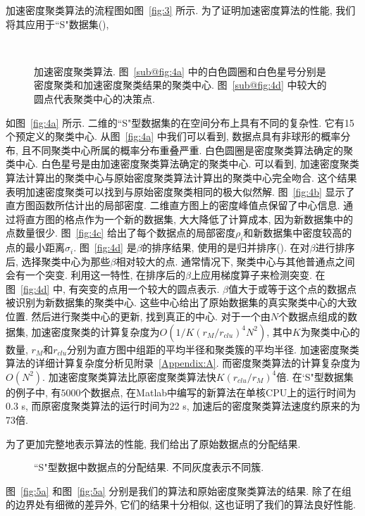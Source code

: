 加速密度聚类算法的流程图如图~\ref{fig:3} 所示. 为了证明加速密度算法的性能, 我们将其应用于``S"数据集(\cite{Fraenti2006}), 
\begin{figure}[htb]
    \centering
    \\
    \caption{加速密度聚类算法. 图~\ref{sub@fig:4a} 中的白色圆圈和白色星号分别是密度聚类和加速密度聚类结果的聚类中心. 图~\ref{sub@fig:4d} 中较大的圆点代表聚类中心的决策点. }
\end{figure}
如图~\ref{fig:4a} 所示. 二维的``S"型数据集的在空间分布上具有不同的复杂性. 它有15个预定义的聚类中心. 从图~\ref{fig:4a} 中我们可以看到, 数据点具有非球形的概率分布, 且不同聚类中心所属的概率分布重叠严重. 白色圆圈是密度聚类算法确定的聚类中心. 白色星号是由加速密度聚类算法确定的聚类中心. 可以看到, 加速密度聚类算法计算出的聚类中心与原始密度聚类算法计算出的聚类中心完全吻合. 这个结果表明加速密度聚类可以找到与原始密度聚类相同的极大似然解. 图~\ref{fig:4b} 显示了直方图函数所估计出的局部密度. 二维直方图上的密度峰值点保留了中心信息. 通过将直方图的格点作为一个新的数据集, 大大降低了计算成本, 因为新数据集中的点数量很少. 图~\ref{fig:4c} 给出了每个数据点的局部密度$\rho_i$和新数据集中密度较高的点的最小距离$\sigma_i$. 图~\ref{fig:4d} 是$\beta$的排序结果, 使用的是归并排序(\cite{Satish2010}). 在对$\beta$进行排序后, 选择聚类中心为那些$\beta$相对较大的点. 通常情况下, 聚类中心与其他普通点之间会有一个突变. 利用这一特性, 在排序后的$\beta$上应用梯度算子来检测突变. 在图~\ref{fig:4d} 中, 有突变的点用一个较大的圆点表示. $\beta$值大于或等于这个点的数据点被识别为新数据集的聚类中心. 这些中心给出了原始数据集的真实聚类中心的大致位置. 然后进行聚类中心的更新, 找到真正的中心. 对于一个由$N$个数据点组成的数据集, 加速密度聚类的计算复杂度为$O(1/K(r_M/r_{clu})^4N^2)$, 其中$K$为聚类中心的数量, $r_M$和$r_{clu}$分别为直方图中组距的平均半径和聚类簇的平均半径. 加速密度聚类算法的详细计算复杂度分析见附录~\ref{Appendix:A}. 而密度聚类算法的计算复杂度为$O(N^2)$. 加速密度聚类算法比原密度聚类算法快$K(r_{clu}/r_M)^4$倍. 在`S"型数据集的例子中, 有$5000$个数据点, 在Matlab中编写的新算法在单核CPU上的运行时间为0.3 s, 而原密度聚类算法的运行时间为22 s, 加速后的密度聚类算法速度约原来的为73倍. 

为了更加完整地表示算法的性能, 我们给出了原始数据点的分配结果. 
\begin{figure}[htb]
    \centering
    \caption{``S"型数据中数据点的分配结果. 不同灰度表示不同簇. \label{fig:5}}
\end{figure}
图~\ref{fig:5a} 和图~\ref{fig:5a} 分别是我们的算法和原始密度聚类算法的结果. 除了在组的边界处有细微的差异外, 它们的结果十分相似, 这也证明了我们的算法良好性能. 

